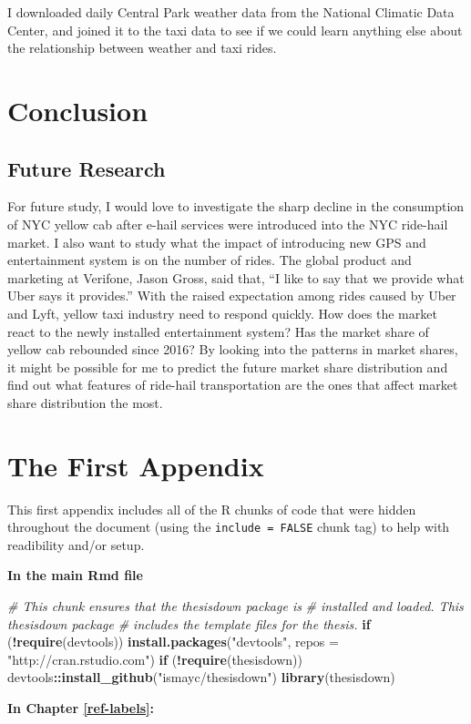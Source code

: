 \documentclass[12pt,twoside]{reedthesis}
\newenvironment{Shaded}{\begin{snugshade}}{\end{snugshade}}
\newcommand{\KeywordTok}[1]{\textcolor[rgb]{0.13,0.29,0.53}{\textbf{#1}}}
\newcommand{\DataTypeTok}[1]{\textcolor[rgb]{0.13,0.29,0.53}{#1}}
\newcommand{\StringTok}[1]{\textcolor[rgb]{0.31,0.60,0.02}{#1}}
\newcommand{\CommentTok}[1]{\textcolor[rgb]{0.56,0.35,0.01}{\textit{#1}}}
\newcommand{\ControlFlowTok}[1]{\textcolor[rgb]{0.13,0.29,0.53}{\textbf{#1}}}
\newcommand{\OperatorTok}[1]{\textcolor[rgb]{0.81,0.36,0.00}{\textbf{#1}}}
\newcommand{\NormalTok}[1]{#1}
\theoremstyle{definition}
\theoremstyle{definition}
\theoremstyle{definition}
\theoremstyle{remark}
\begin{document}
I downloaded daily Central Park weather data from the National Climatic
Data Center, and joined it to the taxi data to see if we could learn
anything else about the relationship between weather and taxi rides.

\chapter{Conclusion}\label{chapter5}

\section{Future Research}\label{future-research}

For future study, I would love to investigate the sharp decline in the
consumption of NYC yellow cab after e-hail services were introduced into
the NYC ride-hail market. I also want to study what the impact of
introducing new GPS and entertainment system is on the number of rides.
The global product and marketing at Verifone, Jason Gross, said that,
``I like to say that we provide what Uber says it provides.'' With the
raised expectation among rides caused by Uber and Lyft, yellow taxi
industry need to respond quickly. How does the market react to the newly
installed entertainment system? Has the market share of yellow cab
rebounded since 2016? By looking into the patterns in market shares, it
might be possible for me to predict the future market share distribution
and find out what features of ride-hail transportation are the ones that
affect market share distribution the most.

\appendix

\chapter{The First Appendix}\label{the-first-appendix}

This first appendix includes all of the R chunks of code that were
hidden throughout the document (using the \texttt{include\ =\ FALSE}
chunk tag) to help with readibility and/or setup.

\textbf{In the main Rmd file}
\begin{Shaded}
\begin{Highlighting}[]
\CommentTok{# This chunk ensures that the thesisdown package is}
\CommentTok{# installed and loaded. This thesisdown package}
\CommentTok{# includes the template files for the thesis.}
\ControlFlowTok{if}\NormalTok{ (}\OperatorTok{!}\KeywordTok{require}\NormalTok{(devtools)) }\KeywordTok{install.packages}\NormalTok{(}\StringTok{"devtools"}\NormalTok{, }
    \DataTypeTok{repos =} \StringTok{"http://cran.rstudio.com"}\NormalTok{)}
\ControlFlowTok{if}\NormalTok{ (}\OperatorTok{!}\KeywordTok{require}\NormalTok{(thesisdown)) devtools}\OperatorTok{::}\KeywordTok{install_github}\NormalTok{(}\StringTok{"ismayc/thesisdown"}\NormalTok{)}
\KeywordTok{library}\NormalTok{(thesisdown)}
\end{Highlighting}
\end{Shaded}
\textbf{In Chapter \ref{ref-labels}:}
\end{document}
